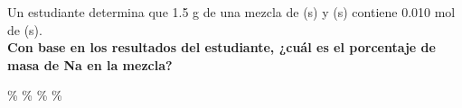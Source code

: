 Un estudiante determina que 1.5 g de una mezcla de (s) y (s) contiene 0.010 mol de (s).\\
\textbf{Con base en los resultados del estudiante, ¿cuál es el porcentaje de masa de Na en la mezcla?}\\

\begin{choices}
    \%
    \%
    \%
    \%
\end{choices}
